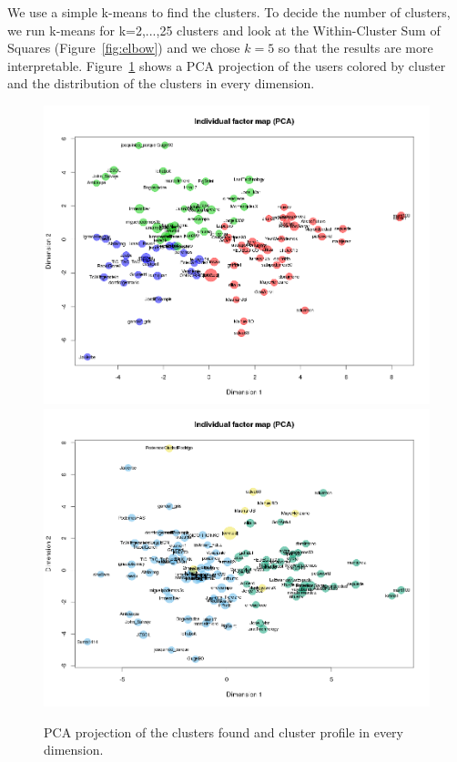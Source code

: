 \documentclass[conference]{IEEEtran}
\begin{document}
We use a simple k-means to find the clusters. To decide the number of clusters, we run k-means for k=2,...,25 clusters and look at the Within-Cluster Sum of Squares (Figure~\ref{fig:elbow}) and we chose $k=5$ so that the results are more interpretable.  Figure~\ref{fig:PCA} shows a PCA projection of the users colored by cluster and the distribution of the clusters in every dimension.

\begin{figure}
	\centering
	\includegraphics[width=1\textwidth]{PCA_cluster_timebased}
	\includegraphics[width=1\textwidth]{PCA_cluster_orderbased}
	\caption{PCA projection of the clusters found and cluster profile in every dimension.}
	\label{fig:PCA}
\end{figure}
\end{document}
